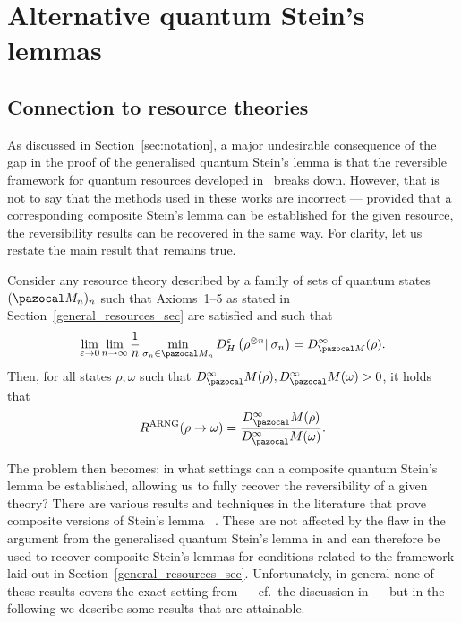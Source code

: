 \documentclass[11pt,notitlepage,tightenlines,nofootinbib,superscriptaddress]{revtex4-1}
\begin{document}

\section{Alternative quantum Stein's lemmas}\label{sec:alternative-stein}

\subsection{Connection to resource theories}

As discussed in Section~\ref{sec:notation}, a major undesirable consequence of the gap in the proof of the generalised quantum Stein's lemma is that the reversible framework for quantum resources developed in~\cite{BrandaoPlenio1,BrandaoPlenio2,Brandao-Gour} breaks down. However, that is not to say that the methods used in these works are incorrect --- provided that a corresponding composite Stein's lemma can be established for the given resource, the reversibility results can be recovered in the same way. For clarity, let us restate the main result that remains true.

\begin{thm} \label{Brandao_Gour_thm}
Consider any resource theory described by a family of sets of quantum states $(\MM_n)_n$ such that Axioms~1--5 as stated in Section~\ref{general_resources_sec} are satisfied and such that
\begin{equation}\begin{aligned}
    \lim_{\epsilon \to 0} \lim_{n \to \infty} \frac1n \min_{\sigma_n \in \MM_n} D^\epsilon_H \left(\rho^{\otimes n} \| \sigma_n \right) = D^\infty_{\MM}(\rho).
\end{aligned}\end{equation}
Then, for all states $\rho, \omega$ such that $D^\infty_\MM(\rho), D^\infty_\MM(\omega) > 0$, it holds that
\begin{equation}\begin{aligned}
    R^{\mathrm{ARNG}}(\rho\to \omega) = \frac{D^\infty_\MM(\rho)}{D^\infty_\MM(\omega)}.
\end{aligned}\end{equation}
\end{thm}
The problem then becomes: in what settings can a composite quantum Stein's lemma be established, allowing us to fully recover the reversibility of a given theory? There are various results and techniques in the literature that prove composite versions of Stein's lemma %
~\cite{brandao_adversarial, hayashitomamichel16, Tomamichel2018, berta_composite, Mosonyi2020}. These are not affected by the flaw in the argument from the generalised quantum Stein’s lemma in \cite{Brandao2010} and can therefore be used to recover composite Stein's lemmas for conditions related to the framework laid out in Section~\ref{general_resources_sec}. Unfortunately, in general none of these results covers the exact setting from \cite{Brandao2010} --- cf.~the discussion in \cite[Section~3.1.5]{brandao_adversarial}%
--- but in the following we describe some results that are attainable.
\end{document}
